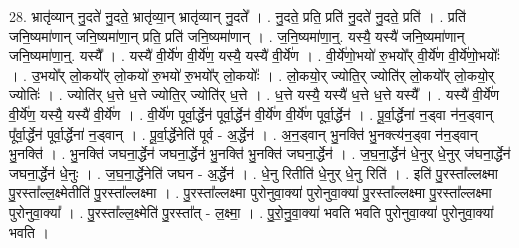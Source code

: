 \documentclass[17pt]{extarticle}
\begin{document}
28. भ्रातृ॑व्यान् नु॒दते॑ नु॒दते॒ भ्रातृ॑व्या॒न् भ्रातृ॑व्यान् नु॒दते᳚ । . नु॒दते॒ प्रति॒ प्रति॑ नु॒दते॑ नु॒दते॒ प्रति॑ । . प्रति॑ जनि॒ष्यमा॑णान् जनि॒ष्यमा॑णा॒न् प्रति॒ प्रति॑ जनि॒ष्यमा॑णान् । . ज॒नि॒ष्यमा॑णा॒न्॒. यस्यै॒ यस्यै॑ जनि॒ष्यमा॑णान् जनि॒ष्यमा॑णा॒न्॒. यस्यै᳚ । . यस्यै॑ वी॒र्ये॑ण वी॒र्ये॑ण॒ यस्यै॒ यस्यै॑ वी॒र्ये॑ण । . वी॒र्ये॑णो॒भयो॑ रु॒भयो᳚र् वी॒र्ये॑ण वी॒र्ये॑णो॒भयोः᳚ । . उ॒भयो᳚र् लो॒कयो᳚र् लो॒कयो॑ रु॒भयो॑ रु॒भयो᳚र् लो॒कयोः᳚ । . लो॒कयो॒र् ज्योति॒र् ज्योति॑र् लो॒कयो᳚र् लो॒कयो॒र् ज्योतिः॑ । . ज्योति॑र् ध॒त्ते ध॒त्ते ज्योति॒र् ज्योति॑र् ध॒त्ते । . ध॒त्ते यस्यै॒ यस्यै॑ ध॒त्ते ध॒त्ते यस्यै᳚ । . यस्यै॑ वी॒र्ये॑ण वी॒र्ये॑ण॒ यस्यै॒ यस्यै॑ वी॒र्ये॑ण । . वी॒र्ये॑ण पूर्वा॒र्द्धेन॑ पूर्वा॒र्द्धेन॑ वी॒र्ये॑ण वी॒र्ये॑ण पूर्वा॒र्द्धेन॑ । . पू॒र्वा॒र्द्धेना॑ न॒ड्वा न॑न॒ड्वान् पू᳚र्वा॒र्द्धेन॑ पूर्वा॒र्द्धेना॑ न॒ड्वान् । . पू॒र्वा॒र्द्धेनेति॑ पूर्व - अ॒र्द्धेन॑ । . अ॒न॒ड्वान् भु॒नक्ति॑ भु॒नक्त्य॑न॒ड्वा न॑न॒ड्वान् भु॒नक्ति॑ । . भु॒नक्ति॑ जघना॒र्द्धेन॑ जघना॒र्द्धेन॑ भु॒नक्ति॑ भु॒नक्ति॑ जघना॒र्द्धेन॑ । . ज॒घ॒ना॒र्द्धेन॑ धे॒नुर् धे॒नुर् ज॑घना॒र्द्धेन॑ जघना॒र्द्धेन॑ धे॒नुः । . ज॒घ॒ना॒र्द्धेनेति॑ जघन - अ॒र्द्धेन॑ । . धे॒नु रितीति॑ धे॒नुर् धे॒नु रिति॑ । . इति॑ पु॒रस्ता᳚ल्लक्ष्मा पु॒रस्ता᳚ल्ल॒क्ष्मेतीति॑ पु॒रस्ता᳚ल्लक्ष्मा । . पु॒रस्ता᳚ल्लक्ष्मा पुरोनुवा॒क्या॑ पुरोनुवा॒क्या॑ पु॒रस्ता᳚ल्लक्ष्मा पु॒रस्ता᳚ल्लक्ष्मा पुरोनुवा॒क्या᳚ । . पु॒रस्ता᳚ल्ल॒क्ष्मेति॑ पु॒रस्ता᳚त् - ल॒क्ष्मा॒ । . पु॒रो॒नु॒वा॒क्या॑ भवति भवति पुरोनुवा॒क्या॑ पुरोनुवा॒क्या॑ भवति । \newline
\end{document}

